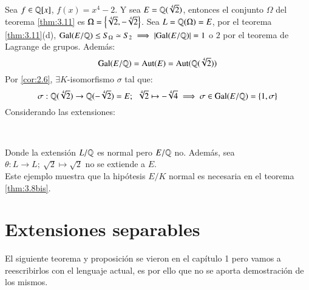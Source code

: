 \begin{eg}
    Sea $f \in \mathbb{Q}[x]$, $f(x) = x^4 - 2$. Y sea $E = \mathbb{Q}(\sqrt[4] 2)$, entonces el conjunto $\Omega$ del teorema \ref{thm:3.11} es $\Omega = \left\{\sqrt[4] 2, -\sqrt[4] 2\right\}$. Sea $L = \mathbb{Q}(\Omega) = E$, por el teorema \ref{thm:3.11}(d), $\mathrm{Gal}(E/\mathbb{Q}) \leq S_\Omega \simeq S_2 \implies |\mathrm{Gal}(E/\mathbb{Q})| = 1$ o $2$ por el teorema de Lagrange de grupos. Además:
    $$
        \mathrm{Gal}(E/\mathbb{Q}) = \mathrm{Aut}(E) = \mathrm{Aut}(\mathbb{Q}(\sqrt[4]{2}))
    $$
    Por \ref{cor:2.6}, $\exists K$-isomorfismo $\sigma$ tal que:
    $$
        \sigma: \mathbb{Q}(\sqrt[4]{2}) \to \mathbb{Q}(-\sqrt[4] 2) = E;\ \ \sqrt[4]{2} \mapsto -\sqrt[4]{4} \implies \sigma \in \mathrm{Gal}(E/\mathbb{Q}) = \left\{1, \sigma\right\}
    $$
    Considerando las extensiones:
    \begin{center}
        \\
    \end{center}
    Donde la extensión $L/\mathbb{Q}$ es normal pero $E/\mathbb{Q}$ no.  Además, sea $\theta: L \to L;\ \sqrt 2 \mapsto \sqrt 2$ no se extiende a $E$.\\

    Este ejemplo muestra que la hipótesis $E/K$ normal es necesaria en el teorema \ref{thm:3.8bis}.
\end{eg}

\section{Extensiones separables}

El siguiente teorema y proposición se vieron en el capítulo 1 pero vamos a reescribirlos con el lenguaje actual, es por ello que no se aporta demostración de los mismos.

